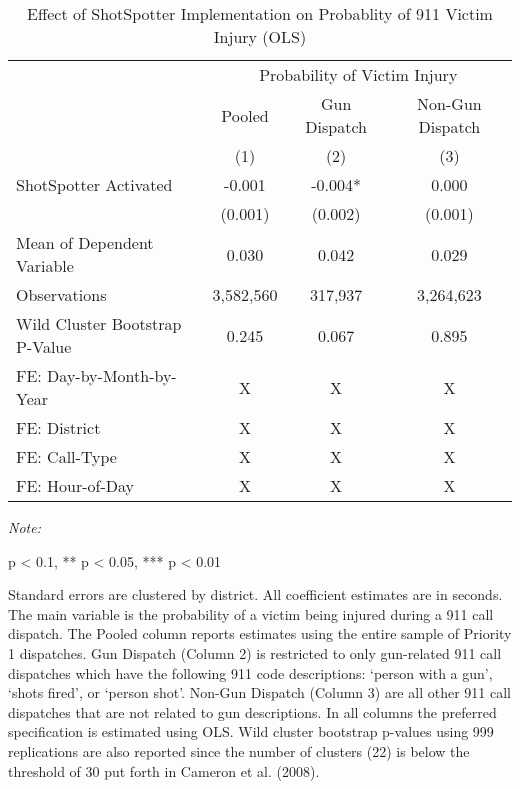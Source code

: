 \begin{table}[H]

\caption{\label{victim_table}Effect of ShotSpotter Implementation on Probablity of 911 Victim Injury (OLS)}
\centering
\begin{threeparttable}
\fontsize{11}{13}\selectfont
\begin{tabular}[t]{>{\raggedright\arraybackslash}p{8cm}ccc}
\toprule
\multicolumn{1}{c}{ } & \multicolumn{3}{c}{Probability of Victim Injury} \\
\cmidrule(l{3pt}r{3pt}){2-4}
\multicolumn{1}{c}{ } & \multicolumn{1}{c}{Pooled} & \multicolumn{1}{c}{Gun Dispatch} & \multicolumn{1}{c}{Non-Gun Dispatch} \\
\cmidrule(l{3pt}r{3pt}){2-2} \cmidrule(l{3pt}r{3pt}){3-3} \cmidrule(l{3pt}r{3pt}){4-4}
  & (1) & (2) & (3)\\
\midrule
ShotSpotter Activated & -0.001 & -0.004* & 0.000\\
 & (0.001) & (0.002) & (0.001)\\
Mean of Dependent Variable & 0.030 & 0.042 & 0.029\\
Observations & 3,582,560 & 317,937 & 3,264,623\\
Wild Cluster Bootstrap P-Value & 0.245 & 0.067 & 0.895\\
\midrule
\addlinespace
FE: Day-by-Month-by-Year & X & X & X\\
FE: District & X & X & X\\
FE: Call-Type & X & X & X\\
FE: Hour-of-Day & X & X & X\\
\bottomrule
\end{tabular}
\begin{tablenotes}
\item \textit{Note: } 
\item * p < 0.1, ** p < 0.05, *** p < 0.01
\item Standard errors are clustered by district. All coefficient                      estimates are in seconds.                      The main variable is the probability of a victim being                      injured during a 911 call dispatch.                      The Pooled column reports estimates using the entire sample of Priority 1                      dispatches.                      Gun Dispatch (Column 2) is restricted to only gun-related 911 call dispatches which                      have the following 911 code descriptions:                      `person with a gun',                  `shots fired', or `person shot'. Non-Gun Dispatch (Column 3) are all other                      911 call dispatches that are not related to gun descriptions. In all columns the preferred specification is estimated using                      OLS. Wild cluster bootstrap p-values using 999 replications are also reported                  since the number of clusters (22) is below the threshold of 30 put forth in                  Cameron et al. (2008).                                    
\end{tablenotes}
\end{threeparttable}
\end{table}
